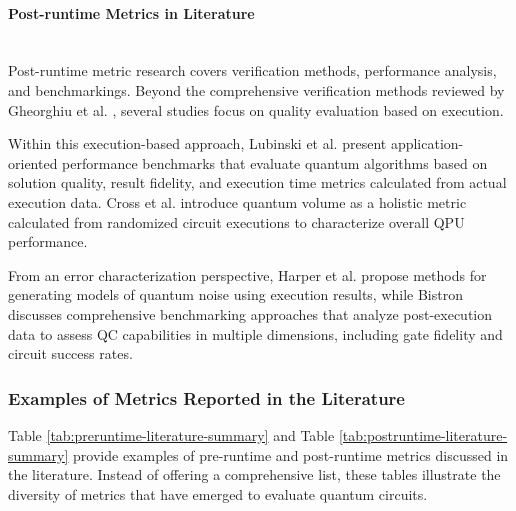 \documentclass{article}
\newcommand{\subsubsubsection}[1]{\paragraph{#1}\mbox{}\\}
\begin{document}
\subsubsubsection{Post-runtime Metrics in Literature}

Post-runtime metric research covers verification methods, performance analysis, and benchmarkings. Beyond the comprehensive verification methods reviewed by Gheorghiu et al. \cite{gheorghiuVerificationQuantumComputation_2019}, several studies focus on quality evaluation based on execution.

Within this execution-based approach, Lubinski et al. \cite{lubinskiApplicationOrientedPerformanceBenchmarks_2023} present application-oriented performance benchmarks that evaluate quantum algorithms based on solution quality, result fidelity, and execution time metrics calculated from actual execution data. Cross et al. \cite{crossValidatingQuantumComputers_2019} introduce quantum volume as a holistic metric calculated from randomized circuit executions to characterize overall QPU performance.

From an error characterization perspective, Harper et al. \cite{harperEfficientLearningQuantum_2020} propose methods for generating models of quantum noise using execution results, while Bistron \cite{bistronBenchmarkingQuantumDevices_2025} discusses comprehensive benchmarking approaches that analyze post-execution data to assess QC capabilities in multiple dimensions, including gate fidelity and circuit success rates.

\subsubsection{Examples of Metrics Reported in the Literature}

Table \ref{tab:preruntime-literature-summary} and Table \ref{tab:postruntime-literature-summary} provide examples of pre-runtime and post-runtime metrics discussed in the literature. Instead of offering a comprehensive list, these tables illustrate the diversity of metrics that have emerged to evaluate quantum circuits.
\end{document}
